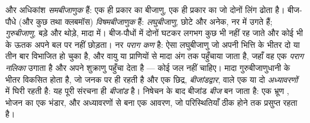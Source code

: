 \begin{definition}[विषमबीजाणुता, पराग, बीजांड]\label{def:b2:plant-life-cycles:heterospory}
 और अधिकांश  \emph{समबीजाणुक} हैं: एक ही प्रकार का बीजाणु, एक ही
प्रकार का  जो दोनों लिंग ढोता है। बीज-पौधे (और कुछ
 तथा क्लबमॉस) \emph{विषमबीजाणुक} हैं: \emph{लघुबीजाणु},
छोटे और अनेक, नर  में उगते हैं; \emph{गुरुबीजाणु}, बड़े
और थोड़े, मादा  में। बीज-पौधों में दोनों घटकर
लगभग कुछ भी नहीं रह जाते और कोई भी  के ऊतक अपने बल पर नहीं
छोड़ता। नर  \emph{पराग कण} है: ऐसा लघुबीजाणु
जो अपनी भित्ति के भीतर दो या तीन बार विभाजित हो चुका है, और वायु या
प्राणियों से मादा अंग तक पहुँचाया जाता है, जहाँ वह एक \emph{पराग नलिका}
उगाता है और अपने शुक्राणु पहुँचा देता है --- कोई जल नहीं चाहिए। मादा
 गुरुबीजाणुधानी के भीतर विकसित होता है, जो जनक पर ही रहती है
और एक छिद्र, \emph{बीजांडद्वार}, वाले एक या दो \emph{अध्यावरणों} में
घिरी रहती है: यह पूरी संरचना ही \emph{बीजांड} है। निषेचन के
बाद बीजांड \emph{बीज} बन जाता है: एक भ्रूण
, भोजन का एक भंडार, और अध्यावरणों से बना एक आवरण,
जो परिस्थितियाँ ठीक होने तक प्रसुप्त रहता है।
\end{definition}

